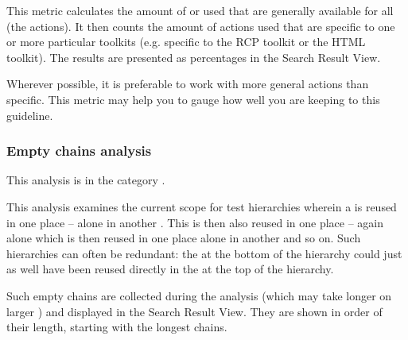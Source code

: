 This metric calculates the amount of \gdcases{} or \gdsteps{} used that are generally available for all  (the  actions). It then counts the amount of actions used that are specific to one or more particular toolkits (e.g. specific to the RCP toolkit or the HTML toolkit). The results are presented as percentages in the Search Result View.

Wherever possible, it is preferable to work with more general actions than specific. This metric may help you to gauge how well you are keeping to this guideline. 

\subsubsection{Empty chains analysis}
This analysis is in the category .

This analysis examines the current scope for test hierarchies wherein a \gdcase{} is reused in one place --  alone in another \gdcase{}. This \gdcase{} is then also reused in one place -- again alone  which is then reused in one place alone in another \gdcase{} and so on. Such hierarchies can often be redundant: the \gdcase{} at the bottom of the hierarchy could just as well have been reused directly in the \gdcase{} at the top of the hierarchy. 

Such empty chains are collected during the analysis (which may take longer on larger \gdprojects{}) and displayed in the Search Result View. They are shown in order of their length, starting with the longest chains.
